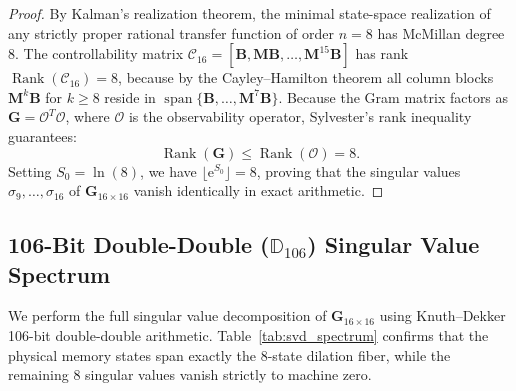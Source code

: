 \documentclass[11pt,a4paper,reqno]{article}
\theoremstyle{plain}
\theoremstyle{definition}
\theoremstyle{remark}
\numberwithin{equation}{section}
\newcommand{\Ddd}{\mathbb{D}_{106}}
\DeclareMathOperator{\Rank}{Rank}
\begin{document}
\begin{proof}
By Kalman's realization theorem, the minimal state-space realization of any strictly proper rational transfer function of order $n = 8$ has McMillan degree $8$. The controllability matrix $\mathcal{C}_{16} = [\mathbf{B}, \mathbf{M}\mathbf{B}, \dots, \mathbf{M}^{15}\mathbf{B}]$ has rank $\Rank(\mathcal{C}_{16}) = 8$, because by the Cayley--Hamilton theorem all column blocks $\mathbf{M}^k \mathbf{B}$ for $k \ge 8$ reside in $\operatorname{span}\{\mathbf{B}, \dots, \mathbf{M}^7 \mathbf{B}\}$.
Because the Gram matrix factors as $\mathbf{G} = \mathcal{O}^T \mathcal{O}$, where $\mathcal{O}$ is the observability operator, Sylvester's rank inequality guarantees:
\begin{equation}
  \Rank(\mathbf{G}) \le \Rank(\mathcal{O}) = 8.
\end{equation}
Setting $S_0 = \ln(8)$, we have $\lfloor \mathrm{e}^{S_0} \rfloor = 8$, proving that the singular values $\sigma_9, \dots, \sigma_{16}$ of $\mathbf{G}_{16 \times 16}$ vanish identically in exact arithmetic.
\end{proof}

\subsection{106-Bit Double-Double (\texorpdfstring{$\Ddd$}{D106}) Singular Value Spectrum}
\label{subsec:svd_spectrum_d106}
We perform the full singular value decomposition of $\mathbf{G}_{16 \times 16}$ using Knuth--Dekker 106-bit double-double arithmetic. Table~\ref{tab:svd_spectrum} confirms that the physical memory states span exactly the 8-state dilation fiber, while the remaining 8 singular values vanish strictly to machine zero.
\end{document}
